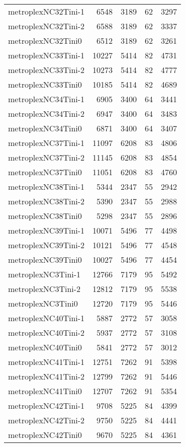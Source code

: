 \begin{longtable}{lrrrr}
metroplexNC32Tini-1 & 6548 & 3189 & 62 & 3297 \\
metroplexNC32Tini-2 & 6588 & 3189 & 62 & 3337 \\
metroplexNC32Tini0 & 6512 & 3189 & 62 & 3261 \\
metroplexNC33Tini-1 & 10227 & 5414 & 82 & 4731 \\
metroplexNC33Tini-2 & 10273 & 5414 & 82 & 4777 \\
metroplexNC33Tini0 & 10185 & 5414 & 82 & 4689 \\
metroplexNC34Tini-1 & 6905 & 3400 & 64 & 3441 \\
metroplexNC34Tini-2 & 6947 & 3400 & 64 & 3483 \\
metroplexNC34Tini0 & 6871 & 3400 & 64 & 3407 \\
metroplexNC37Tini-1 & 11097 & 6208 & 83 & 4806 \\
metroplexNC37Tini-2 & 11145 & 6208 & 83 & 4854 \\
metroplexNC37Tini0 & 11051 & 6208 & 83 & 4760 \\
metroplexNC38Tini-1 & 5344 & 2347 & 55 & 2942 \\
metroplexNC38Tini-2 & 5390 & 2347 & 55 & 2988 \\
metroplexNC38Tini0 & 5298 & 2347 & 55 & 2896 \\
metroplexNC39Tini-1 & 10071 & 5496 & 77 & 4498 \\
metroplexNC39Tini-2 & 10121 & 5496 & 77 & 4548 \\
metroplexNC39Tini0 & 10027 & 5496 & 77 & 4454 \\
metroplexNC3Tini-1 & 12766 & 7179 & 95 & 5492 \\
metroplexNC3Tini-2 & 12812 & 7179 & 95 & 5538 \\
metroplexNC3Tini0 & 12720 & 7179 & 95 & 5446 \\
metroplexNC40Tini-1 & 5887 & 2772 & 57 & 3058 \\
metroplexNC40Tini-2 & 5937 & 2772 & 57 & 3108 \\
metroplexNC40Tini0 & 5841 & 2772 & 57 & 3012 \\
metroplexNC41Tini-1 & 12751 & 7262 & 91 & 5398 \\
metroplexNC41Tini-2 & 12799 & 7262 & 91 & 5446 \\
metroplexNC41Tini0 & 12707 & 7262 & 91 & 5354 \\
metroplexNC42Tini-1 & 9708 & 5225 & 84 & 4399 \\
metroplexNC42Tini-2 & 9750 & 5225 & 84 & 4441 \\
metroplexNC42Tini0 & 9670 & 5225 & 84 & 4361 \\

\end{longtable}
